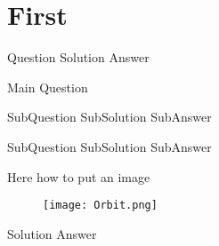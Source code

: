 \chapter{First}


\begin{problem}
{
Question
}
{
Solution
}
{
Answer
}
\end{problem}



\begin{problem}
{
Main Question
}{}{}
\end{problem}
\begin{subproblem}
{
SubQuestion
}
{
SubSolution
}
{
SubAnswer
}
\end{subproblem}
\begin{subproblem}
{
SubQuestion
}
{
SubSolution
}
{
SubAnswer
}
\end{subproblem}


\begin{problem}
    {
    Here how to put an image
    \begin{figure}[H]
        \centering
        \texttt{[image: Orbit.png]}
    \end{figure}
    }
    {
    Solution
    }
    {
    Answer
    }
    \end{problem} 